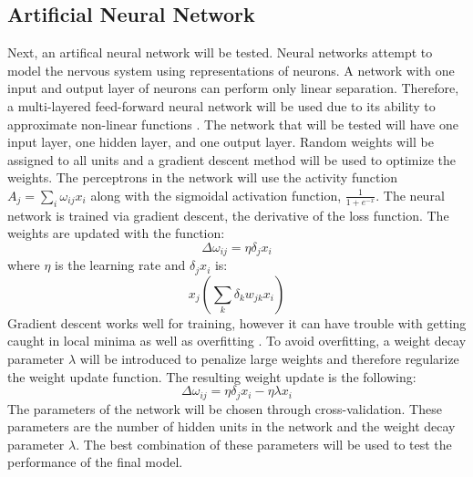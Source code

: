 \documentclass[twoside,11pt]{article}
\begin{document}
\subsection{Artificial Neural Network}
Next, an artifical neural network will be tested.  Neural networks attempt to
model the nervous system using representations of neurons.  A network with one
input and output layer of neurons can perform only linear separation.
Therefore, a multi-layered feed-forward neural network will be used due to its
ability to approximate non-linear functions \cite{Werbos:1974}.  The network
that will be tested will have one input layer, one hidden layer, and one output
layer.  Random weights will be assigned to all units and a gradient descent
method will be used to optimize the weights.  The perceptrons in the network
will use the activity function $A_{j} = \sum_i \omega_{ij} x_{i}$ along with
the sigmoidal activation function, $\frac{1}{1 + e^{-x}}$.  The neural network
is trained via gradient descent, the derivative of the loss function.  The
weights are updated with the function:
\begin{equation}
  \Delta \omega_{ij} = \eta \delta_j x_i
\end{equation} 
where $\eta$ is the learning rate and $\delta_j x_i$ is:
\begin{equation}
  [1-x_j]x_j(\sum_k \delta_k w_{jk} x_i)
\end{equation}
Gradient descent works well for training, however it can have trouble with
getting caught in local minima as well as overfitting \cite{Rojas:1996}.  To
avoid overfitting, a weight decay parameter $\lambda$ will be introduced to
penalize large weights and therefore regularize the weight update function.
The resulting weight update is the following: 
\begin{equation}
  \Delta \omega_{ij} = \eta \delta_j x_i - \eta \lambda x_i %
\end{equation} 
The parameters of the network will be chosen through cross-validation.  These
parameters are the number of hidden units in the network and the weight decay
parameter $\lambda$.  The best combination of these parameters will be used to
test the performance of the final model.
\end{document}
